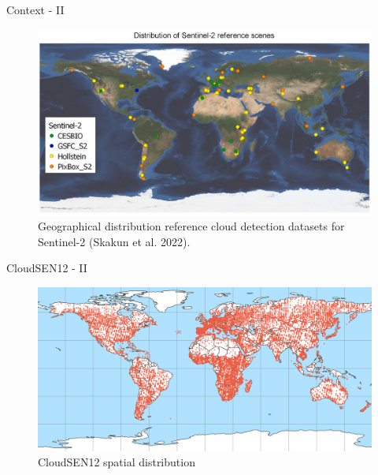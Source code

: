 \begin{frame}{Context - II}
	\begin{center}
		\begin{figure}
			\centering
			\includegraphics[width=0.85\linewidth]{images/intro_fig01.png}
			\caption[fig:introfig01]{Geographical distribution reference cloud detection datasets for Sentinel-2 (Skakun et al. 2022).}
			\label{fig:introfig01}
		\end{figure}
	\end{center}
\end{frame}

\begin{frame}{CloudSEN12 - II}
	\begin{center}
		\begin{figure}
			\includegraphics[width=0.85\linewidth]{images/intro_fig04.png}
			\caption[fig:introfig04]{CloudSEN12 spatial distribution}
		\end{figure}
	\end{center}
\end{frame}
